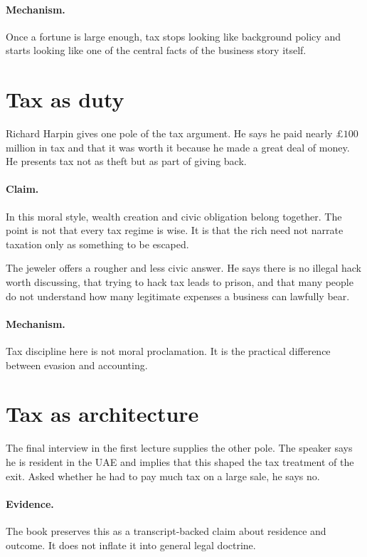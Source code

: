 \documentclass[11pt,oneside]{book}
\begin{document}
\paragraph{Mechanism.} Once a fortune is large enough, tax stops looking like background policy and starts looking like one of the central facts of the business story itself.

\section{Tax as duty}

Richard Harpin gives one pole of the tax argument. He says he paid nearly \(\pounds 100\) million in tax and that it was worth it because he made a great deal of money. He presents tax not as theft but as part of giving back.

\paragraph{Claim.} In this moral style, wealth creation and civic obligation belong together. The point is not that every tax regime is wise. It is that the rich need not narrate taxation only as something to be escaped.

The jeweler offers a rougher and less civic answer. He says there is no illegal hack worth discussing, that trying to hack tax leads to prison, and that many people do not understand how many legitimate expenses a business can lawfully bear.

\paragraph{Mechanism.} Tax discipline here is not moral proclamation. It is the practical difference between evasion and accounting.

\section{Tax as architecture}

The final interview in the first lecture supplies the other pole. The speaker says he is resident in the UAE and implies that this shaped the tax treatment of the exit. Asked whether he had to pay much tax on a large sale, he says no.

\paragraph{Evidence.} The book preserves this as a transcript-backed claim about residence and outcome. It does not inflate it into general legal doctrine.
\end{document}
